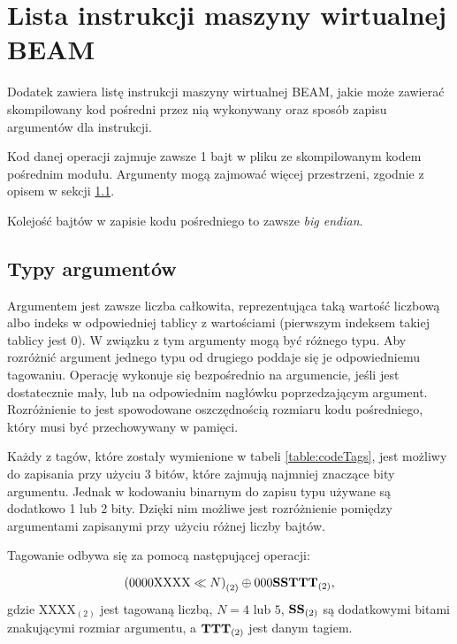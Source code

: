 \chapter{Lista instrukcji maszyny wirtualnej BEAM}
\label{cha:operacjeBeam}

Dodatek zawiera listę instrukcji maszyny wirtualnej BEAM, jakie może zawierać skompilowany kod pośredni przez nią wykonywany oraz sposób zapisu argumentów dla instrukcji.

Kod danej operacji zajmuje zawsze 1 bajt w pliku ze skompilowanym kodem pośrednim modułu. 
Argumenty mogą zajmować więcej przestrzeni, zgodnie z opisem w sekcji \ref{sec:opsTypes}.

Kolejość bajtów w zapisie kodu pośredniego to zawsze \emph{big endian}.


\section{Typy argumentów}
\label{sec:opsTypes}
Argumentem jest zawsze liczba całkowita, reprezentująca taką wartość liczbową albo indeks w odpowiedniej tablicy z wartościami (pierwszym indeksem takiej tablicy jest 0). W związku z tym argumenty mogą być różnego typu. Aby rozróżnić argument jednego typu od drugiego poddaje się je odpowiedniemu tagowaniu. Operację wykonuje się bezpośrednio na argumencie, jeśli jest dostatecznie mały, lub na odpowiednim nagłówku poprzedzającym argument. Rozróżnienie to jest spowodowane oszczędnością rozmiaru kodu pośredniego, który musi być przechowywany w pamięci.

Każdy z tagów, które zostały wymienione w tabeli \ref{table:codeTags}, jest możliwy do zapisania przy użyciu 3 bitów, które zajmują najmniej znaczące bity argumentu.
Jednak w kodowaniu binarnym do zapisu typu używane są dodatkowo 1 lub 2 bity. Dzięki nim możliwe jest rozróżnienie pomiędzy argumentami zapisanymi przy użyciu różnej liczby bajtów.

Tagowanie odbywa się za pomocą następującej operacji:

$${(0000\text{XXXX} \ll N)}_{(2)} \oplus {000\text{\textbf{SS}}\text{\textbf{TTT}}}_{(2)},$$
gdzie $\text{XXXX}_{(2)}$ jest tagowaną liczbą, 
$N=4 \text{ lub } 5$, 
$\text{\textbf{SS}}_{(2)}$ są dodatkowymi bitami znakującymi rozmiar argumentu, a
$\text{\textbf{TTT}}_{(2)}$ jest danym tagiem.

